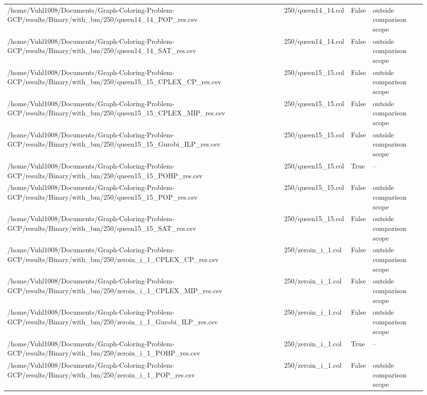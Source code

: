 \begin{table}[htbp]
\begin{tabular}{llll}
/home/Vuhl1008/Documents/Graph-Coloring-Problem-GCP/results/Binary/with\_bm/250/queen14\_14\_POP\_res.csv & 250/queen14\_14.col & False & outside comparison scope \\
/home/Vuhl1008/Documents/Graph-Coloring-Problem-GCP/results/Binary/with\_bm/250/queen14\_14\_SAT\_res.csv & 250/queen14\_14.col & False & outside comparison scope \\
/home/Vuhl1008/Documents/Graph-Coloring-Problem-GCP/results/Binary/with\_bm/250/queen15\_15\_CPLEX\_CP\_res.csv & 250/queen15\_15.col & False & outside comparison scope \\
/home/Vuhl1008/Documents/Graph-Coloring-Problem-GCP/results/Binary/with\_bm/250/queen15\_15\_CPLEX\_MIP\_res.csv & 250/queen15\_15.col & False & outside comparison scope \\
/home/Vuhl1008/Documents/Graph-Coloring-Problem-GCP/results/Binary/with\_bm/250/queen15\_15\_Gurobi\_ILP\_res.csv & 250/queen15\_15.col & False & outside comparison scope \\
/home/Vuhl1008/Documents/Graph-Coloring-Problem-GCP/results/Binary/with\_bm/250/queen15\_15\_POHP\_res.csv & 250/queen15\_15.col & True & -- \\
/home/Vuhl1008/Documents/Graph-Coloring-Problem-GCP/results/Binary/with\_bm/250/queen15\_15\_POP\_res.csv & 250/queen15\_15.col & False & outside comparison scope \\
/home/Vuhl1008/Documents/Graph-Coloring-Problem-GCP/results/Binary/with\_bm/250/queen15\_15\_SAT\_res.csv & 250/queen15\_15.col & False & outside comparison scope \\
/home/Vuhl1008/Documents/Graph-Coloring-Problem-GCP/results/Binary/with\_bm/250/zeroin\_i\_1\_CPLEX\_CP\_res.csv & 250/zeroin\_i\_1.col & False & outside comparison scope \\
/home/Vuhl1008/Documents/Graph-Coloring-Problem-GCP/results/Binary/with\_bm/250/zeroin\_i\_1\_CPLEX\_MIP\_res.csv & 250/zeroin\_i\_1.col & False & outside comparison scope \\
/home/Vuhl1008/Documents/Graph-Coloring-Problem-GCP/results/Binary/with\_bm/250/zeroin\_i\_1\_Gurobi\_ILP\_res.csv & 250/zeroin\_i\_1.col & False & outside comparison scope \\
/home/Vuhl1008/Documents/Graph-Coloring-Problem-GCP/results/Binary/with\_bm/250/zeroin\_i\_1\_POHP\_res.csv & 250/zeroin\_i\_1.col & True & -- \\
/home/Vuhl1008/Documents/Graph-Coloring-Problem-GCP/results/Binary/with\_bm/250/zeroin\_i\_1\_POP\_res.csv & 250/zeroin\_i\_1.col & False & outside comparison scope \\

\end{tabular}
\end{table}
